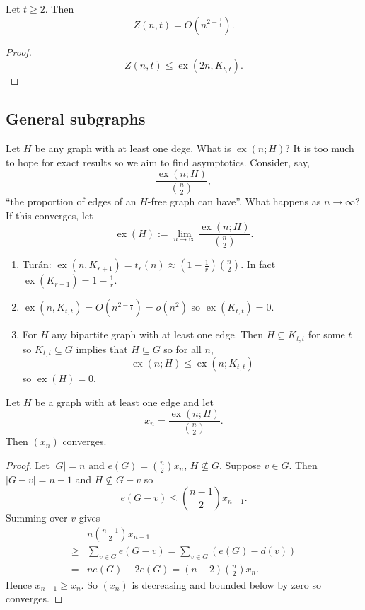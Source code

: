 \documentclass[a4paper]{article}
\DeclareMathOperator{\exx}{ex} %
\begin{document}
\begin{corollary}
  Let \(t \geq 2\). Then
  \[
    Z(n, t) = O(n^{2 - \frac{1}{t}}).
  \]
\end{corollary}

\begin{proof}
  \[
    Z(n, t) \leq \exx(2n, K_{t, t}).
  \]
\end{proof}

\subsection{General subgraphs}

Let \(H\) be any graph with at least one dege. What is \(\exx(n; H)\)? It is too much to hope for exact results so we aim to find asymptotics. Consider, say,
\[
  \frac{\exx(n; H)}{\binom{n}{2}},
\]
``the proportion of edges of an \(H\)-free graph can have''. What happens as \(n \to \infty\)? If this converges, let
\[
  \exx(H) := \lim_{n \to \infty} \frac{\exx(n; H)}{\binom{n}{2}}.
\]

\begin{eg}\leavevmode
  \begin{enumerate}
  \item Turán: \(\exx(n, K_{r + 1}) = t_r(n) \approx (1 - \frac{1}{r}) \binom{n}{2}\). In fact \(\exx(K_{r + 1}) = 1 - \frac{1}{r}\).
  \item \(\exx(n, K_{t, t}) = O(n^{2 - \frac{1}{t}}) = o(n^2)\) so \(\exx(K_{t, t}) = 0\).
  \item For \(H\) any bipartite graph with at least one edge. Then \(H \subseteq K_{t, t}\) for some \(t\) so \(K_{t, t} \subseteq G\) implies that \(H \subseteq G\) so for all \(n\),
    \[
      \exx(n; H) \leq \exx(n; K_{t, t})
    \]
    so \(\exx(H) = 0\).
  \end{enumerate}
\end{eg}

\begin{proposition}
  Let \(H\) be a graph with at least one edge and let
  \[
    x_n = \frac{\exx(n; H)}{\binom{n}{2}}.
  \]
  Then \((x_n)\) converges.
\end{proposition}

\begin{proof}
  Let \(|G| = n\) and \(e(G) = \binom{n}{2} x_n\), \(H \nsubseteq G\). Suppose \(v \in G\). Then \(|G - v| = n - 1\) and \(H \nsubseteq G - v\) so
  \[
    e(G - v) \leq \binom{n - 1}{2} x_{n - 1}.
  \]
  Summing over \(v\) gives
  \begin{align*}
    & n \binom{n - 1}{2} x_{n - 1} \\
    \geq& \sum_{v \in G} e(G - v) = \sum_{v \in G} (e(G) - d(v)) \\
    =& n e(G) - 2e(G) = (n - 2) \binom{n}{2} x_n.
  \end{align*}
  Hence \(x_{n - 1} \geq x_n\). So \((x_n)\) is decreasing and bounded below by zero so converges.
\end{proof}
\end{document}
